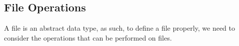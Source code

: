 \subsection{File Operations}\label{subsec:File_Operations}
A file is an abstract data type, as such, to define a file properly, we need to consider the operations that can be performed on files.


